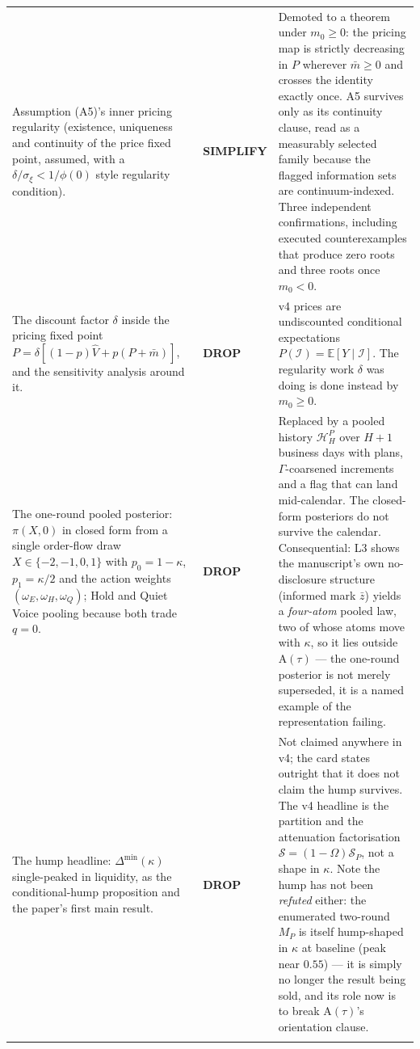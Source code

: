 \documentclass[11pt,a4paper]{article}
\newcommand{\Eop}{\mathbb{E}}
\newcommand{\Atau}{\mathrm{A}(\tau)}
\begin{document}
\begin{longtable}{@{}>{\raggedright\arraybackslash}p{}>{\raggedright\arraybackslash}p{}>{\raggedright\arraybackslash}p{}@{}}
Assumption (A5)'s inner pricing regularity (existence, uniqueness and continuity of
the price fixed point, assumed, with a $\delta/\sigma_\xi<1/\phi(0)$ style
regularity condition). &
\textbf{SIMPLIFY} &
Demoted to a theorem under $m_0\ge0$: the pricing map is strictly decreasing in $P$
wherever $\bar m\ge0$ and crosses the identity exactly once. A5 survives only as its
continuity clause, read as a measurably selected family because the flagged
information sets are continuum-indexed. Three independent confirmations, including
executed counterexamples that produce zero roots and three roots once $m_0<0$. \\
\addlinespace

The discount factor $\delta$ inside the pricing fixed point
$P=\delta[(1-p)\hat V+p(P+\bar m)]$, and the sensitivity analysis around it. &
\textbf{DROP} &
v4 prices are undiscounted conditional expectations $P(\mathcal I)=\Eop[Y\mid\mathcal I]$.
The regularity work $\delta$ was doing is done instead by $m_0\ge0$. \\
\addlinespace

The one-round pooled posterior: $\pi(X,0)$ in closed form from a single order-flow
draw $X\in\{-2,-1,0,1\}$ with $p_0=1-\kappa$, $p_1=\kappa/2$ and the action weights
$(\omega_E,\omega_H,\omega_Q)$; Hold and Quiet Voice pooling because both trade $q=0$. &
\textbf{DROP} &
Replaced by a pooled history $\mathcal H_H^P$ over $H+1$ business days with plans,
$\Gamma$-coarsened increments and a flag that can land mid-calendar. The closed-form
posteriors do not survive the calendar. Consequential: L3 shows the manuscript's
own no-disclosure structure (informed mark $\bar z$) yields a \emph{four-atom} pooled
law, two of whose atoms move with $\kappa$, so it lies outside $\Atau$ --- the
one-round posterior is not merely superseded, it is a named example of the
representation failing. \\
\addlinespace

The hump headline: $\Delta^{\min}(\kappa)$ single-peaked in liquidity, as the
conditional-hump proposition and the paper's first main result. &
\textbf{DROP} &
Not claimed anywhere in v4; the card states outright that it does not claim the hump
survives. The v4 headline is the partition and the attenuation factorisation
$\mathcal S=(1-\Omega)\mathcal S_P$, not a shape in $\kappa$. Note the hump has not
been \emph{refuted} either: the enumerated two-round $M_P$ is itself hump-shaped in
$\kappa$ at baseline (peak near $0.55$) --- it is simply no longer the result being
sold, and its role now is to break $\Atau$'s orientation clause. \\
\addlinespace


\end{longtable}
\end{document}
